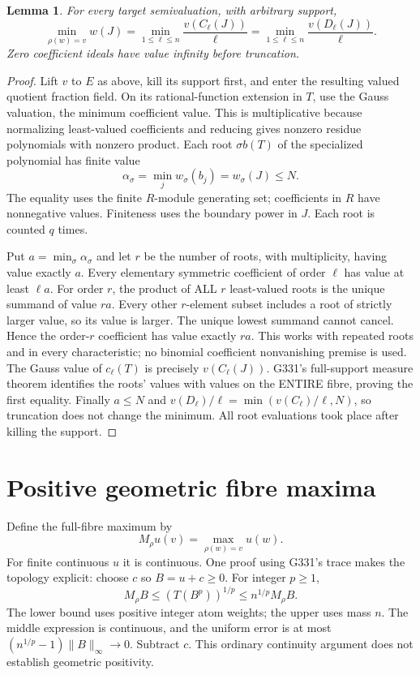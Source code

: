 \documentclass[11pt]{article}
\newtheorem{lemma}[theorem]{Lemma}
\begin{document}
\begin{lemma}\label{coeff}
For every target semivaluation, with arbitrary support,
\[
 \min_{\rho(w)=v}w(J)
   =\min_{1\le\ell\le n}\frac{v(C_\ell(J))}{\ell}
   =\min_{1\le\ell\le n}\frac{v(D_\ell(J))}{\ell}.
\]
Zero coefficient ideals have value infinity before truncation.
\end{lemma}
\begin{proof}
Lift $v$ to $E$ as above, kill its support first, and enter the resulting
valued quotient fraction field. On its rational-function extension in
$T$, use the Gauss valuation, the minimum coefficient value. This is
multiplicative because normalizing least-valued coefficients and reducing
gives nonzero residue polynomials with nonzero product.
Each root $\sigma b(T)$ of the specialized polynomial has finite value
\[
 \alpha_\sigma=\min_j w_\sigma(b_j)=w_\sigma(J)\le N.
\]
The equality uses the finite $R$-module generating set; coefficients in
$R$ have nonnegative values. Finiteness uses the boundary power in $J$.
Each root is counted $q$ times.

Put $a=\min_\sigma\alpha_\sigma$ and let $r$ be the number of roots,
with multiplicity, having value exactly $a$. Every elementary symmetric
coefficient of order $\ell$ has value at least $\ell a$.
For order $r$, the product of ALL $r$ least-valued roots is the unique
summand of value $ra$. Every other $r$-element subset includes a root of
strictly larger value, so its value is larger. The unique lowest summand
cannot cancel. Hence the order-$r$ coefficient has value exactly $ra$.
This works with repeated roots and in every characteristic; no binomial
coefficient nonvanishing premise is used.
The Gauss value of $c_\ell(T)$ is precisely $v(C_\ell(J))$.
G331's full-support measure theorem identifies the roots' values with
values on the ENTIRE fibre, proving the first equality.
Finally $a\le N$ and
$v(D_\ell)/\ell=\min(v(C_\ell)/\ell,N)$, so truncation does not change
the minimum. All root evaluations took place after killing the support.
\end{proof}

\section{Positive geometric fibre maxima}
Define the full-fibre maximum by
\[
 M_\rho u(v)=\max_{\rho(w)=v}u(w).
\]
For finite continuous $u$ it is continuous. One proof using G331's trace
makes the topology explicit: choose $c$ so $B=u+c\ge0$. For integer $p\ge1$,
\[
 M_\rho B\le(T(B^p))^{1/p}\le n^{1/p}M_\rho B.
\]
The lower bound uses positive integer atom weights; the upper uses mass
$n$. The middle expression is continuous, and the uniform error is at
most $(n^{1/p}-1)\|B\|_\infty\to0$. Subtract $c$.
This ordinary continuity argument does not establish geometric positivity.
\end{document}
